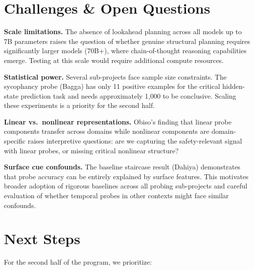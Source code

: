 \documentclass[midterm]{sparreport}
\begin{document}
\section{Challenges \& Open Questions}

\textbf{Scale limitations.} The absence of lookahead planning across all models up to 7B parameters raises the question of whether genuine structural planning requires significantly larger models (70B+), where chain-of-thought reasoning capabilities emerge. Testing at this scale would require additional compute resources.

\textbf{Statistical power.} Several sub-projects face sample size constraints. The sycophancy probe (Bagga) has only 11 positive examples for the critical hidden-state prediction task and needs approximately 1,000 to be conclusive. Scaling these experiments is a priority for the second half.

\textbf{Linear vs.\ nonlinear representations.} Obiso's finding that linear probe components transfer across domains while nonlinear components are domain-specific raises interpretive questions: are we capturing the safety-relevant signal with linear probes, or missing critical nonlinear structure?

\textbf{Surface cue confounds.} The baseline staircase result (Dahiya) demonstrates that probe accuracy can be entirely explained by surface features. This motivates broader adoption of rigorous baselines across all probing sub-projects and careful evaluation of whether temporal probes in other contexts might face similar confounds.

\section{Next Steps}

For the second half of the program, we prioritize:
\end{document}
